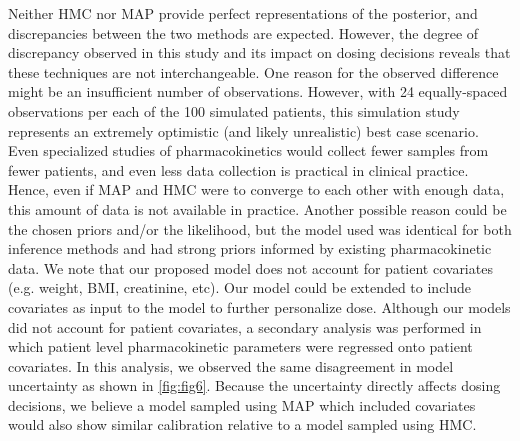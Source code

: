 Neither HMC nor MAP provide perfect representations of the posterior, and discrepancies between the two methods are expected. However, the degree of discrepancy observed in this study and its impact on dosing decisions reveals that these techniques are not interchangeable. One reason for the observed difference might be an insufficient number of observations.  However, with 24 equally-spaced observations per each of the 100 simulated patients, this simulation study represents an extremely optimistic (and likely unrealistic) best case scenario. Even specialized studies of pharmacokinetics would collect fewer samples from fewer patients, and even less data collection is practical in clinical practice. Hence, even if MAP and HMC were to converge to each other with enough data, this amount of data is not available in practice. Another possible reason could be the chosen priors and/or the likelihood, but the model used was identical for both inference methods and had strong priors informed by existing pharmacokinetic data.  We note that our proposed model does not account for patient covariates (e.g. weight, BMI, creatinine, etc).  Our model could be extended to include covariates as input to the model to further personalize dose. Although our models did not account for patient covariates, a secondary analysis was performed in which patient level pharmacokinetic parameters were regressed onto patient covariates.  In this analysis, we observed the same disagreement in model uncertainty as shown in \cref{fig:fig6}.  Because the uncertainty directly affects dosing decisions, we believe a model sampled using MAP which included covariates would also show similar calibration relative to a model sampled using HMC.


